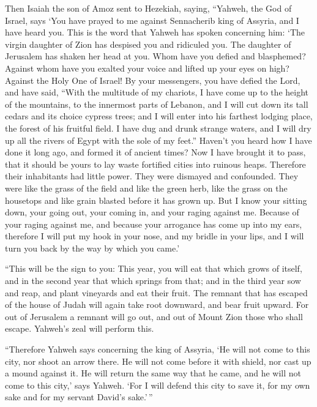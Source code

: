 \begin{paracol}{2}
\begin{otherlanguage}{english}
 Then Isaiah the son of Amoz sent to Hezekiah, saying,
``Yahweh, the God of Israel, says `You have prayed to me against
Sennacherib king of Assyria, and I have heard you.  This
is the word that Yahweh has spoken concerning him: `The virgin daughter
of Zion has despised you and ridiculed you. The daughter of Jerusalem
has shaken her head at you.  Whom have you defied and
blasphemed? Against whom have you exalted your voice and lifted up your
eyes on high? Against the Holy One of Israel!  By your
messengers, you have defied the Lord, and have said, ``With the
multitude of my chariots, I have come up to the height of the mountains,
to the innermost parts of Lebanon, and I will cut down its tall cedars
and its choice cypress trees; and I will enter into his farthest lodging
place, the forest of his fruitful field.  I have dug and
drunk strange waters, and I will dry up all the rivers of Egypt with the
sole of my feet.''  Haven't you heard how I have done it
long ago, and formed it of ancient times? Now I have brought it to pass,
that it should be yours to lay waste fortified cities into ruinous
heaps.  Therefore their inhabitants had little power.
They were dismayed and confounded. They were like the grass of the field
and like the green herb, like the grass on the housetops and like grain
blasted before it has grown up.  But I know your sitting
down, your going out, your coming in, and your raging against me.
 Because of your raging against me, and because your
arrogance has come up into my ears, therefore I will put my hook in your
nose, and my bridle in your lips, and I will turn you back by the way by
which you came.'

 ``This will be the sign to you: This year, you will eat
that which grows of itself, and in the second year that which springs
from that; and in the third year sow and reap, and plant vineyards and
eat their fruit.  The remnant that has escaped of the
house of Judah will again take root downward, and bear fruit upward.
 For out of Jerusalem a remnant will go out, and out of
Mount Zion those who shall escape. Yahweh's zeal will perform this.

 ``Therefore Yahweh says concerning the king of Assyria,
`He will not come to this city, nor shoot an arrow there. He will not
come before it with shield, nor cast up a mound against it.
 He will return the same way that he came, and he will
not come to this city,' says Yahweh.  `For I will defend
this city to save it, for my own sake and for my servant David's
sake.'\,''


\end{otherlanguage}
\end{paracol}
